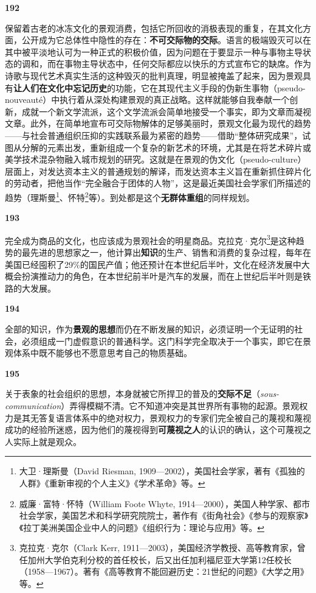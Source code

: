 \documentclass[fontset=fandol, a4paper, 12pt, openright]{ctexbook}
\makeatletter
\newcommand{\thesis}[1]{%
    \par\vspace{1.5em}%
    {\centering \textbf{\Large #1}\par}%
    \nobreak\vspace{0.5em}\nobreak
    \@afterindenttrue %
    \@afterheading    %
}
\makeatother
\begin{document}
\thesis{192}
保留着古老的冰冻文化的景观消费，包括它所回收的消极表现的重复，在其文化方面，公开成为它总体性中隐性的存在：\textbf{不可交际物的交际}。语言的极端毁灭可以在其中被平淡地认可为一种正式的积极价值，因为问题在于要显示一种与事物主导状态的调和，而在事物主导状态中，任何交际都应以快乐的方式宣布它的缺席。作为诗歌与现代艺术真实生活的这种毁灭的批判真理，明显被掩盖了起来，因为景观具有\textbf{让人们在文化中忘记历史}的功能，它在其现代主义手段的伪新生事物（pseudo-nouveauté）中执行着从深处构建景观的真正战略。这样就能够自我奉献一个创新，成就一个新文学流派，这个文学流派会简单地接受一个事实，即为文章而凝视文章。此外，在简单地宣布可交际物解体的足够美丽时，景观文化最为现代的趋势——与社会普通组织压抑的实践联系最为紧密的趋势——借助“整体研究成果”，试图从分解的元素出发，重新组成一个复杂的新艺术的环境，尤其是在将艺术碎片或美学技术混杂物融入城市规划的研究。这就是在景观的伪文化（pseudo-culture）层面上，对发达资本主义的普通规划的解译，而发达资本主义旨在重新抓住碎片化的劳动者，把他当作“完全融合于团体的人物”，这是最近美国社会学家们所描述的趋势（理斯曼\footnote{大卫·理斯曼（David Riesman, 1909—2002），美国社会学家，著有《孤独的人群》《重新审视的个人主义》《学术革命》等。}、怀特\footnote{威廉·富特·怀特（William Foote Whyte, 1914—2000），美国人种学家、都市社会学家，美国艺术和科学研究院院士，著作有《街角社会》《参与的观察家》《拉丁美洲美国企业中人的问题》《组织行为：理论与应用》等。}等）。到处都是这个\textbf{无群体重组}的同样规划。

\thesis{193}
完全成为商品的文化，也应该成为景观社会的明星商品。克拉克·克尔\footnote{克拉克·克尔（Clark Kerr, 1911—2003），美国经济学教授、高等教育家，曾任加州大学伯克利分校的首任校长，后又出任加利福尼亚大学第12任校长（1958—1967）。著有《高等教育不能回避历史：21世纪的问题》《大学之用》等。}是这种趋势的最先进的思想家之一，他计算出\textbf{知识}的生产、销售和消费的复杂过程，每年在美国已经囤积了29\%的国民产值；他还预计在本世纪后半叶，文化在经济发展中大概会扮演推动力的角色，在本世纪前半叶是汽车的发展，而在上世纪后半叶则是铁路的大发展。

\thesis{194}
全部的知识，作为\textbf{景观的思想}而仍在不断发展的知识，必须证明一个无证明的社会，必须组成一门虚假意识的普通科学。这门科学完全取决于一个事实，即它在景观体系中既不能够也不愿意思考自己的物质基础。

\thesis{195}
关于表象的社会组织的思想，本身就被它所捍卫的普及的\textbf{交际不足}（\textit{sous-communication}）弄得模糊不清。它不知道冲突是其世界所有事物的起源。景观权力是其无答复语言体系中的绝对权力，景观权力的专家们完全被自己的蔑视和蔑视成功的经验所迷惑，因为他们的蔑视得到\textbf{可蔑视之人}的认识的确认，这个可蔑视之人实际上就是观众。
\end{document}
